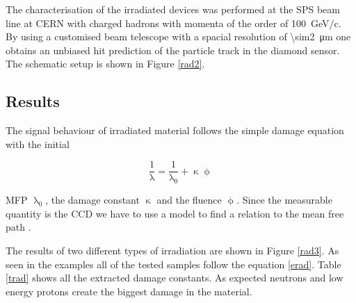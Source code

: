 The characterisation of the irradiated devices was performed at the \ac{SPS} beam line at CERN with charged hadrons with momenta of the order of \SI{100}{\giga\electronvolt/c}. By using a customised beam telescope with a spacial resolution of \SI{\sim2}{\micro\meter} one obtains an unbiased hit prediction of the particle track in the diamond sensor. The schematic setup is shown in Figure \vref{rad2}.


\subsection{Results}

The signal behaviour of irradiated material follows the simple damage equation with the initial 

\begin{equation}
	\frac{1}{\uplambda} = \frac{1}{\uplambda_0} + \upkappa\upphi \label{erad}
\end{equation}

\noindent
\ac{MFP} $\uplambda_0$, the damage constant $\upkappa$ and the fluence $\upphi$. Since the measurable quantity is the \ac{CCD} we have to use a model to find a relation to the mean free path \cite{felix}.


The results of two different types of irradiation are shown in Figure \vref{rad3}. As seen in the examples all of the tested samples follow the equation \vref{erad}. Table \vref{trad} shows all the extracted damage constants. As expected neutrons and low energy protons create the biggest damage in the material.

